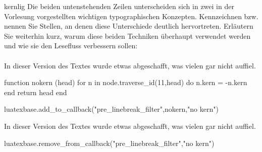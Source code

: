 \documentclass[
	german,
	blatt=2,
	ausgabe=25.\,10.\,2013,
	rückgabe=08.\,11.\,2013
]{lcourse-hd}
\begin{document}
\begin{exercise}[name=Kerning und Ligaturen,punkte=4,abgabe = Hand- oder maschinenschriftliche Antwort zu den Fragen.]{kernlig}
Die beiden untenstehenden Zeilen unterscheiden sich in zwei in der Vorlesung vorgestellten wichtigen typographischen Konzepten. Kennzeichnen bzw. nennen Sie Stellen, an denen diese Unterschiede deutlich hervortreten. Erläutern Sie weiterhin kurz, warum diese beiden Techniken überhaupt verwendet werden und wie sie den Lesefluss verbessern sollen:
\\ \\
In dieser Version des Textes wurde etwas abgeschafft, was vielen gar nicht auffiel.

\begin{luacode}

function nokern (head)
    for n in node.traverse_id(11,head) do
      n.kern = -n.kern
    end
  return head
end

luatexbase.add_to_callback("pre_linebreak_filter",nokern,"no kern")

\end{luacode}

In dieser Version des Textes wurde etwas abgeschafft, was vielen gar nicht auffiel.


\begin{luacode}
luatexbase.remove_from_callback("pre_linebreak_filter","no kern")
\end{luacode}

\end{exercise}
\end{document}
